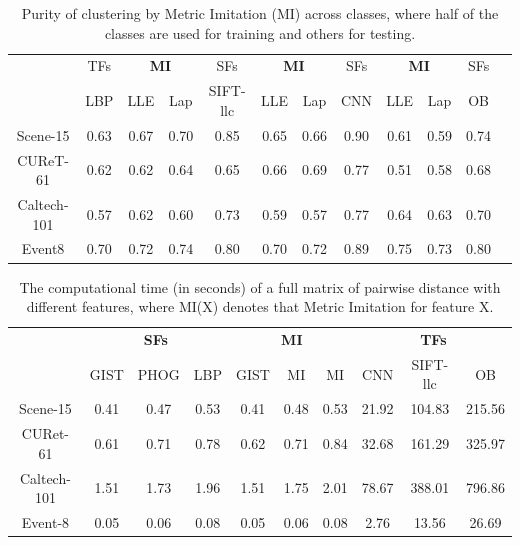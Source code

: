 \begin{table}[!tb]
  \centering \small  \setlength{\tabcolsep}{.60em} 
  \caption{Purity of clustering by Metric Imitation (MI) across classes, where half of the classes are used for training and others for testing.}
  \begin{tabular}{c|c|ccc|ccc|cccc}
   & TFs & \multicolumn{2}{c}{\textbf{MI}} & SFs & \multicolumn{2}{c}{ \textbf{MI} } & SFs & \multicolumn{2}{c}{ \textbf{MI}} & SFs  \\   
    & LBP & LLE & Lap & SIFT-llc  & LLE & Lap & CNN &  LLE & Lap & OB     \\   \hline
     Scene-15    & 0.63  & 0.67  & 0.70  & 0.85  & 0.65  & 0.66  & 0.90    & 0.61  & 0.59  & 0.74 \\ 
    CUReT-61 & 0.62  & 0.62  & 0.64  & 0.65   & 0.66  & 0.69  & 0.77   & 0.51  & 0.58  & 0.68 \\ 
    Caltech-101 & 0.57  & 0.62  & 0.60  & 0.73  & 0.59  & 0.57  & 0.77     & 0.64  &0.63 &  0.70   \\ 
    Event8 & 0.70  & 0.72  & 0.74  & 0.80   & 0.70  & 0.72  & 0.89    & 0.75  & 0.73  & 0.80\\    \end{tabular}
  \label{tab:clustering:across}
\end{table}


\begin{table}[!tb]
  \centering \small  \setlength{\tabcolsep}{.60em} 
  \caption{The computational time (in seconds) of a full matrix of pairwise distance with different 
    features, where MI(X) denotes that Metric Imitation for feature X.   }
  \begin{tabular}{c|ccc|ccc|ccc}  
 &  \multicolumn{3}{c}{\textbf{SFs}}   & \multicolumn{3}{c}{\textbf{MI}} & \multicolumn{3}{c}{\textbf{TFs}}  \\ 
   & GIST   & PHOG &LBP &  GIST & MI  &  MI &   CNN & SIFT-llc & OB \\ \hline
 Scene-15 & 0.41    & 0.47 & 0.53  & 0.41     & 0.48 & 0.53 & 21.92 & 104.83  & 215.56   \\
 CURet-61  & 0.61  & 0.71 & 0.78    & 0.62    & 0.71 & 0.84 & 32.68 & 161.29  & 325.97   \\ 
 Caltech-101 & 1.51  & 1.73 & 1.96  & 1.51    & 1.75 & 2.01  & 78.67  & 388.01  & 796.86 \\ 
 Event-8  & 0.05    & 0.06 & 0.08  & 0.05   & 0.06 & 0.08    & 2.76 & 13.56  & 26.69  \\ 
  \end{tabular}
  \label{tab:time}
\end{table}


